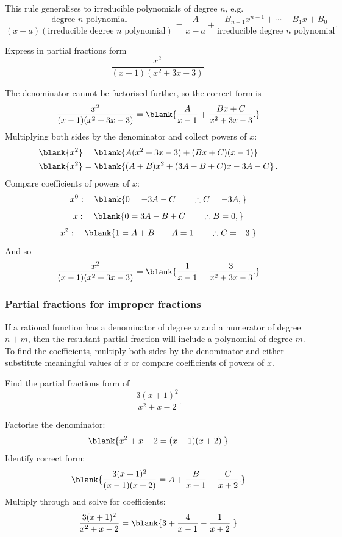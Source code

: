 This rule generalises to irreducible polynomials of degree $n$, e.g.
\[
\frac{\text{degree }n\text{ polynomial}}{(x-a)(\text{irreducible degree }n\text{ polynomial})}
=
\frac{A}{x-a}+\frac{B_{n-1}x^{n-1}+\cdots+B_1x+B_0}{\text{irreducible degree }n\text{ polynomial}}.
\]

\begin{example}[Video]
Express in partial fractions form
\[
\frac{x^2}{(x-1)(x^2+3x-3)}.
\]
\end{example}

\begin{solution}
The denominator cannot be factorised further, so the correct form is
\[
\frac{x^2}{(x-1)(x^2+3x-3)}=\blank{\frac{A}{x-1}+\frac{Bx+C}{x^2+3x-3}.}
\]
Multiplying both sides by the denominator and collect powers of $x$:
\begin{align*}
    \blank{x^2} &= \blank{A(x^2+3x-3) + (Bx+C)(x-1)} \\
    \blank{x^2} &= \blank{(A+B)x^2+(3A-B+C)x-3A-C} \, .
\end{align*}
Compare coefficients of powers of $x$:
\[
x^0:\quad \blank{0=-3A-C \qquad \therefore C=-3A,}
\]
\[
x:\quad \blank{0=3A-B+C \qquad \therefore B=0,}
\]
\[
x^2:\quad \blank{1=A+B \qquad A=1 \qquad \therefore C=-3.}
\]
And so
\[
\frac{x^2}{(x-1)(x^2+3x-3)}=\blank{\frac{1}{x-1}-\frac{3}{x^2+3x-3}.}
\]
\end{solution}

\subsubsection{Partial fractions for improper fractions}

If a rational function has a denominator of degree $n$ and a numerator of degree $n+m$, then the resultant partial fraction will include a polynomial of degree $m$. To find the coefficients, multiply both sides by the denominator and either substitute meaningful values of $x$ or compare coefficients of powers of $x$.

\begin{example}[Lecture]
Find the partial fractions form of
\[
\frac{3(x+1)^2}{x^2+x-2}.
\]
\end{example}

\begin{solution}
Factorise the denominator:
\[
\blank{x^2+x-2=(x-1)(x+2).}
\]
Identify correct form:
\[
\blank{\frac{3(x+1)^2}{(x-1)(x+2)}=A+\frac{B}{x-1}+\frac{C}{x+2}.}
\]
Multiply through and solve for coefficients:
\[
\frac{3(x+1)^2}{x^2+x-2}=\blank{3+\frac{4}{x-1}-\frac{1}{x+2}.}
\]
\end{solution}

